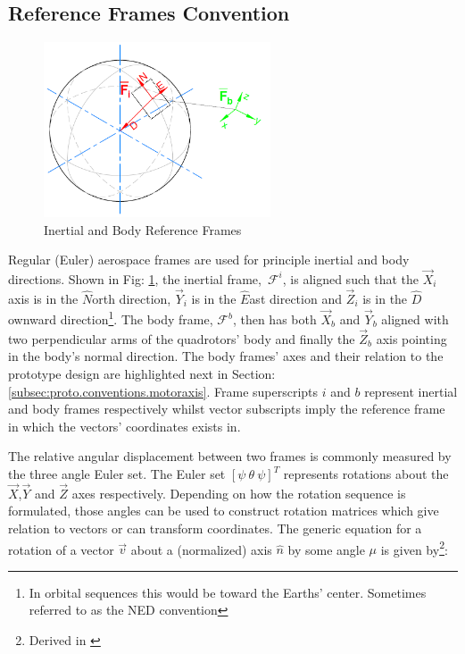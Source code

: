 \subsection{Reference Frames Convention}
\label{subsec:proto.conventions.frames}
\begin{figure}[htbp]
\centering
\includegraphics[width=0.6\textwidth]{figs/reference_frame}
\caption{Inertial and Body Reference Frames}
\label{fig:ref_frame}
\end{figure}
Regular (Euler) aerospace frames are used for principle inertial and body directions. Shown in Fig: \ref{fig:ref_frame}, the inertial frame,~$\mathcal{F}^i$, is aligned such that the $\vec{X}_i$ axis is in the $\hat{N}$orth direction, $\vec{Y}_i$ is in the $\hat{E}$ast direction and $\vec{Z}_i$ is  in the $\hat{D}$ownward direction\footnote{In orbital sequences this would be toward the Earths' center. Sometimes referred to as the NED convention}. The body frame, $\mathcal{F}^b$, then has both $\vec{X}_b$ and $\vec{Y}_b$ aligned with two perpendicular arms of the quadrotors' body and finally the $\vec{Z}_b$ axis pointing in the body's normal direction. The body frames' axes and their relation to the prototype design are highlighted next in Section:\ref{subsec:proto.conventions.motoraxis}. Frame superscripts $i$ and $b$ represent inertial and body frames respectively whilst vector subscripts imply the reference frame in which the vectors' coordinates exists in.
\par
The relative angular displacement between two frames is commonly measured by the three angle Euler set. The Euler set $[\psi ~\theta ~\psi]^T$ represents rotations about the $\vec{X}$,$\vec{Y}$ and $\vec{Z}$ axes respectively. Depending on how the rotation sequence is formulated, those angles can be used to construct rotation matrices which give relation to vectors or can transform coordinates. The generic equation for a rotation of a vector $\vec{v}$ about a (normalized) axis $\hat{n}$ by some angle $\mu$ is given by\footnote{Derived in \cite{quaddynamics}}:
